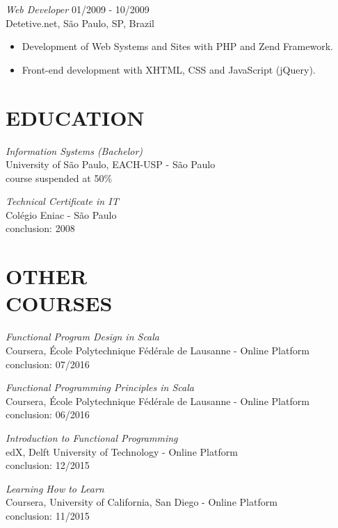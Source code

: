 \documentclass[line,margin]{res}
\begin{document}
\begin{resume}
                {\sl Web Developer} \hfill 01/2009 - 10/2009 \\
                Detetive.net, São Paulo, SP, Brazil
                 \begin{itemize}  \itemsep 1.25pt
                 \item Development of Web Systems and Sites with PHP and Zend Framework.
                 \item Front-end development with XHTML, CSS and JavaScript (jQuery).
                 \end{itemize} 

\section{EDUCATION} {\sl Information Systems (Bachelor)} \\
                University of São Paulo, EACH-USP - São Paulo \\
                course suspended at 50\%
		
			{\sl Technical Certificate in IT} \\
	                Colégio Eniac - São Paulo \\
	                conclusion: 2008
                
\section{OTHER \\ COURSES}   
           {\sl Functional Program Design in Scala} \\
			Coursera, École Polytechnique Fédérale de Lausanne - Online Platform \\
			conclusion: 07/2016
			
           {\sl Functional Programming Principles in Scala} \\
			Coursera, École Polytechnique Fédérale de Lausanne - Online Platform \\
			conclusion: 06/2016
			
		   {\sl Introduction to Functional Programming} \\
			edX, Delft University of Technology - Online Platform \\
			conclusion: 12/2015

		   {\sl Learning How to Learn} \\
			Coursera, University of California, San Diego - Online Platform\\
			conclusion: 11/2015
		

\end{resume}
\end{document}
